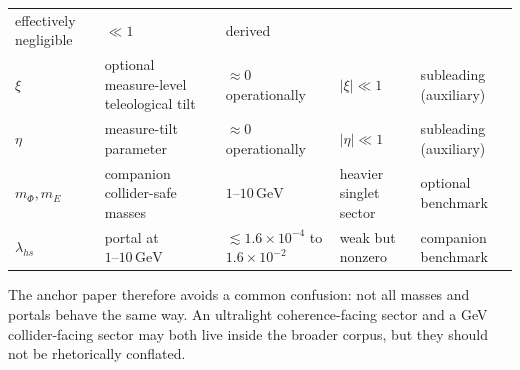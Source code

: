 \documentclass[aps,prd,twocolumn,superscriptaddress,nofootinbib]{revtex4-2}
\begin{document}
\begin{table}[t]
\begin{tabular}{@{}lllll@{}}
\parbox[t]{0.17\textwidth}{\raggedright effectively negligible} &
\parbox[t]{0.23\textwidth}{\raggedright $\ll 1$} &
\parbox[t]{0.16\textwidth}{\raggedright derived} \\
$\xi$ &
\parbox[t]{0.20\textwidth}{\raggedright optional measure-level teleological tilt} &
\parbox[t]{0.17\textwidth}{\raggedright $\approx 0$ operationally} &
\parbox[t]{0.23\textwidth}{\raggedright $|\xi|\ll 1$} &
\parbox[t]{0.16\textwidth}{\raggedright subleading (auxiliary)} \\
$\eta$ &
\parbox[t]{0.20\textwidth}{\raggedright measure-tilt parameter} &
\parbox[t]{0.17\textwidth}{\raggedright $\approx 0$ operationally} &
\parbox[t]{0.23\textwidth}{\raggedright $|\eta|\ll 1$} &
\parbox[t]{0.16\textwidth}{\raggedright subleading (auxiliary)} \\
\midrule
$m_{\Phi},m_E$ &
\parbox[t]{0.20\textwidth}{\raggedright companion collider-safe masses} &
\parbox[t]{0.17\textwidth}{\raggedright $1$--$10\,\mathrm{GeV}$} &
\parbox[t]{0.23\textwidth}{\raggedright heavier singlet sector} &
\parbox[t]{0.16\textwidth}{\raggedright optional benchmark} \\
$\lambda_{hs}$ &
\parbox[t]{0.20\textwidth}{\raggedright portal at $1\text{--}10\,\mathrm{GeV}$} &
\parbox[t]{0.17\textwidth}{\raggedright $\lesssim 1.6\times10^{-4}$ to $1.6\times10^{-2}$} &
\parbox[t]{0.23\textwidth}{\raggedright weak but nonzero} &
\parbox[t]{0.16\textwidth}{\raggedright companion benchmark} \\
\bottomrule
\end{tabular}
\end{table}

The anchor paper therefore avoids a common confusion: not all masses and portals behave the same way. An ultralight coherence-facing sector and a GeV collider-facing sector may both live inside the broader corpus, but they should not be rhetorically conflated.
\end{document}
